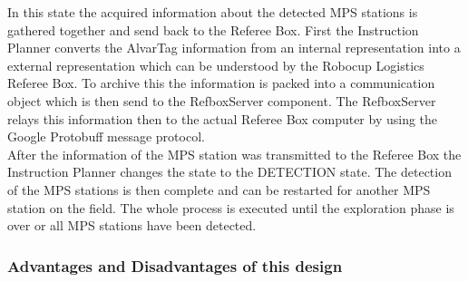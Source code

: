 \begin{itemize}
In this state the acquired information about the detected MPS stations is gathered together and send back to the Referee Box. First the Instruction Planner converts the AlvarTag information from an internal representation into a external representation which can be understood by the  Robocup Logistics Referee Box. To archive this the information is packed into a communication object which is then send to the RefboxServer component. The RefboxServer relays this information then to the actual Referee Box computer by using the Google Protobuff message protocol.  \\

After the information of the MPS station was transmitted to the Referee Box the Instruction Planner changes the state to the DETECTION state. The detection of the MPS stations is then complete and can be restarted for another MPS station on the field. The whole process is executed until the exploration phase is over or all MPS stations have been detected. 


\end{itemize}



\subsubsection{Advantages and Disadvantages of this design} 


